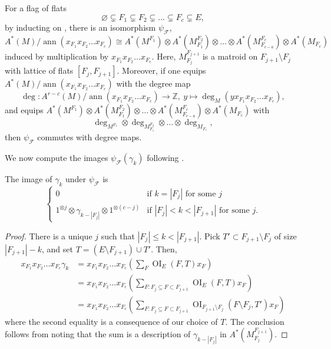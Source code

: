 \documentclass[ALCO,published]{cedram}
\numberwithin{equation}{section}
\numberwithin{figure}{section}
\newcommand{\Z}{\mathbb{Z}}
\newcommand{\cF}{\mathcal{F}}
\DeclareMathOperator{\OI}{OI}
\DeclareMathOperator{\ann}{ann}
\begin{document}
For a flag of flats 
\[\varnothing\subsetneq F_1\subsetneq F_2\subsetneq\dots\subsetneq F_c\subsetneq E,\]
by inducting on \cite[Prop~2.25]{BHMPW:semismall}, there is an isomorphism $\psi_{\cF}$,
\[
A^*(M)/\ann(x_{F_1}x_{F_2}\dots x_{F_c})\cong
A^*(M^{F_1})\otimes A^*(M_{F_1}^{F_2})\otimes\dots \otimes A^*(M_{F_{c-a}}^{F_c})\otimes A^*(M_{F_c})
\]
induced by multiplication by $x_{F_1}x_{F_2}\dots x_{F_c}$.
Here, $M_{F_j}^{F_{j+1}}$ is a matroid on $F_{j+1}\setminus F_j$ with lattice of flats $[F_j,F_{j+1}]$.
Moreover, if one equips $A^*(M)/\ann(x_{F_1}x_{F_2}\dots x_{F_c})$ with the degree map
\[\deg\colon A^{r-c}(M)/\ann(x_{F_1}x_{F_2}\dots x_{F_c})\to\Z,\ y\mapsto \deg_M(yx_{F_1}x_{F_2}\dots x_{F_c}),\]
and equips $A^*(M^{F_1})\otimes A^*(M_{F_1}^{F_2})\otimes\dots \otimes A^*(M_{F_{c-a}}^{F_c})\otimes A^*(M_{F_c})$
with 
\[\deg_{M^{F_1}}\otimes\deg_{M_{F_1}^{F_2}}\otimes \dots \otimes \deg_{M_{F_c}},\]
then $\psi_{\cF}$ commutes with degree maps.

We now compute the images $\psi_{\cF}(\gamma_k)$ following \cite[Lemma 6.5]{BST}.

\begin{lemma} \label{l:productwithflag}
The image of $\gamma_k$ under $\psi_{\cF}$ is 
\[\begin{cases}
0 &\text{if $k=|F_j|$ for some $j$}\\
1^{\otimes j}\otimes \gamma_{k-|F_j|}\otimes 1^{\otimes(c-j)}&\text{if $|F_j|<k<|F_{j+1}|$ for some $j$}.
\end{cases}
\]
\end{lemma}

\begin{proof}
There is a unique $j$ such that $|F_j|\leq k<|F_{j+1}|$. Pick $T'\subset F_{j+1}\setminus F_j$ of size $|F_{j+1}|- k$, and set $T=(E\setminus F_{j+1})\cup T'$. Then,
  \begin{align*}
      x_{F_1}x_{F_2}\dots x_{F_c}\gamma_k
      &=  x_{F_1}x_{F_2}\dots x_{F_c}\left(\sum_F \OI_{E}(F,T)x_F\right)\\
      &=  x_{F_1}x_{F_2}\dots x_{F_c}\left(\sum_{F\colon F_j\subseteq F\subset F_{j+1}} \OI_{E}(F,T)x_F\right)\\
      &=  x_{F_1}x_{F_2}\dots x_{F_c}\left(\sum_{F\colon F_j\subseteq F\subset F_{j+1}} \OI_{F_{j+1}\setminus F_j}(F\setminus F_j,T')x_F\right)
  \end{align*}
  where the second equality is a consequence of our choice of $T$.
  The conclusion follows from noting that the sum is a description of $\gamma_{k-|F_j|}$ in $A^*(M_{F_j}^{F_{j+1}})$.
\end{proof}
\end{document}
